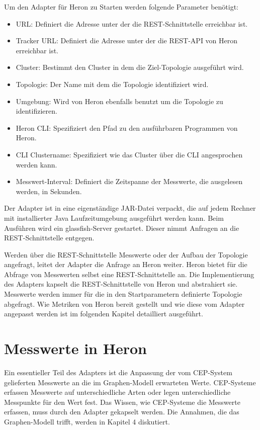 Um den Adapter für Heron zu Starten werden folgende Parameter benötigt:
\begin{itemize}
\item{URL: Definiert die Adresse unter der die REST-Schnittstelle erreichbar ist.}
\item{Tracker URL: Definiert die Adresse unter der die REST-API von Heron erreichbar ist.}
\item{Cluster: Bestimmt den Cluster in dem die Ziel-Topologie ausgeführt wird.}
\item{Topologie: Der Name mit dem die Topologie identifiziert wird.}
\item{Umgebung: Wird von Heron ebenfalls benutzt um die Topologie zu identifizieren.}
\item{Heron CLI: Spezifiziert den Pfad zu den ausführbaren Programmen von Heron.}
\item{CLI Clustername: Spezifiziert wie das Cluster über die CLI angesprochen werden kann.}
\item{Messwert-Interval: Definiert die Zeitspanne der Messwerte, die ausgelesen werden, in Sekunden.}
\end{itemize}
Der Adapter ist in eine eigenständige JAR-Datei verpackt, die auf jedem Rechner mit installierter Java Laufzeitumgebung ausgeführt werden kann.
Beim Ausführen wird ein glassfish-Server gestartet.
Dieser nimmt Anfragen an die REST-Schnittstelle entgegen.

Werden über die REST-Schnittstelle Messwerte oder der Aufbau der Topologie angefragt, leitet der Adapter die Anfrage an Heron weiter.
Heron bietet für die Abfrage von Messwerten selbst eine REST-Schnittstelle an.
Die Implementierung des Adapters kapselt die REST-Schnittstelle von Heron und abstrahiert sie.
Messwerte werden immer für die in den Startparametern definierte Topologie abgefragt.
Wie Metriken von Heron bereit gestellt und wie diese vom Adapter angepasst werden ist im folgenden Kapitel detailliert ausgeführt.

\section{Messwerte in Heron}

Ein essentieller Teil des Adapters ist die Anpassung der vom CEP-System gelieferten Messwerte an die im Graphen-Modell erwarteten Werte.
CEP-Systeme erfassen Messwerte auf unterschiedliche Arten oder legen unterschiedliche Messpunkte für den Wert fest.
Das Wissen, wie CEP-Systeme die Messwerte erfassen, muss durch den Adapter gekapselt werden.
Die Annahmen, die das Graphen-Modell trifft, werden in Kapitel 4 diskutiert.

